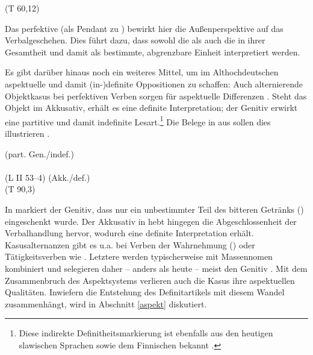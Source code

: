 \begin{exe}
	\ex \label{ex:menigi}   (T 60,12)\\ 	
\end{exe}

\noindent
Das perfektive  (als Pendant zu ) bewirkt hier die Außenperspektive auf das Verbalgeschehen. Dies führt dazu, dass sowohl die  als auch die  in ihrer Gesamtheit und damit als bestimmte, abgrenzbare Einheit interpretiert werden. 

Es gibt darüber hinaus noch ein weiteres Mittel, um im Althochdeutschen aspektuelle und damit (in-)definite Oppositionen zu schaffen: Auch alternierende Objektkasus bei perfektiven Verben sorgen für aspektuelle Differenzen  \parencite{Donhauser1990,Leiss1994,Abraham1997,Philippi1997}. Steht das Objekt im Akkusativ, erhält es eine definite Interpretation; der Genitiv erwirkt eine partitive und damit indefinite Lesart.\footnote{Diese indirekte Definitheitsmarkierung ist ebenfalls aus den heutigen slawischen Sprachen sowie dem Finnischen bekannt \parencite[74]{Philippi1997}.} Die Belege in  aus \textcite[65]{Philippi1997} sollen dies illustrieren \parencite[vgl. auch][49]{Ferraresi2014}.

\begin{exe}
	\ex \label{ex:ahd-gen-akk}
		\begin{xlist}
		\ex \label{ex:ahd-gen}   (part. Gen./indef.) \\ 
		 \\ (L II 53--4)
		\ex \label{ex:ahd-akk}   (Akk./def.) \\   (T 90,3)
		\end{xlist}
\end{exe}
\noindent
In  markiert der Genitiv, dass nur ein unbestimmter Teil des bitteren Getränks () eingeschenkt wurde. Der Akkusativ in  hebt hingegen die Abgeschlossenheit der Verbalhandlung hervor, wodurch  eine definite Interpretation erhält. Kasusalternanzen gibt es u.a. bei Verben der Wahrnehmung () oder Tätigkeitsverben wie  \parencite[s.][100]{Donhauser1990}. Letztere werden typischerweise mit Massennomen kombiniert und selegieren daher -- anders als heute --  meist den Genitiv \parencite[36]{Abraham1997}. Mit dem Zusammenbruch des Aspektsystems verlieren auch die Kasus ihre aspektuellen Qualitäten. Inwiefern die Entstehung des Definitartikels mit diesem Wandel zusammenhängt, wird in Abschnitt \ref{aspekt} diskutiert. 
 
